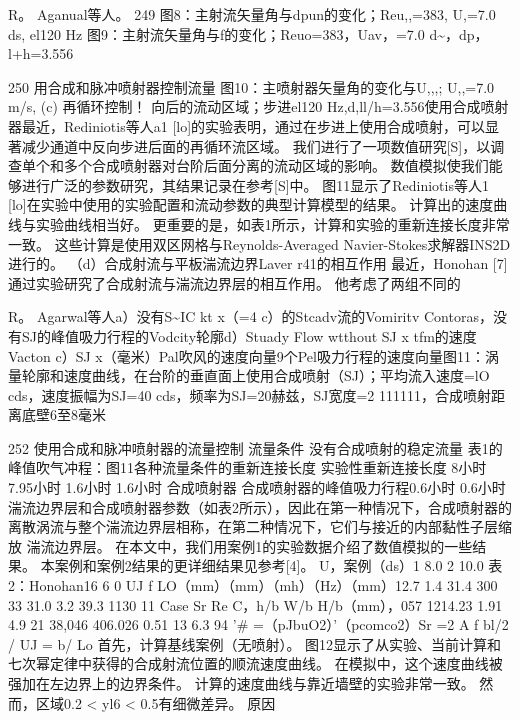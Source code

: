 \documentclass[UTF8,11pt,a4paper,openany,fontset=fandol]{ctexbook}
\begin{document}
R。 Aganual等人。 249 图8：主射流矢量角与dpun的变化；Reu,,=383, U,=7.0 ds, el120 Hz 图9：主射流矢量角与f的变化；Reuo=383，Uav，=7.0 d\textasciitilde{}，dp，l+h=3.556

250 用合成和脉冲喷射器控制流量 图10：主喷射器矢量角的变化与U,,,; U,,=7.0 m/s, (c) 再循环控制！ 向后的流动区域；步进el120 Hz,d,ll/h=3.556使用合成喷射器最近，Rediniotis等人a1 [lo]的实验表明，通过在步进上使用合成喷射，可以显著减少通道中反向步进后面的再循环流区域。 我们进行了一项数值研究[S]，以调查单个和多个合成喷射器对台阶后面分离的流动区域的影响。 数值模拟使我们能够进行广泛的参数研究，其结果记录在参考[S]中。 图11显示了Rediniotis等人1 [lo]在实验中使用的实验配置和流动参数的典型计算模型的结果。 计算出的速度曲线与实验曲线相当好。 更重要的是，如表1所示，计算和实验的重新连接长度非常一致。 这些计算是使用双区网格与Reynolds-Averaged Navier-Stokes求解器INS2D进行的。 （d）合成射流与平板湍流边界Laver r41的相互作用 最近，Honohan [7]通过实验研究了合成射流与湍流边界层的相互作用。 他考虑了两组不同的

R。 Agarwal等人a）没有S\textasciitilde{}IC kt x（=4 c）的Stcadv流的Vomiritv Contoras，没有SJ的峰值吸力行程的Vodcity轮廓d）Stuady Flow wtthout SJ x tfm的速度Vacton c）SJ x（毫米）Pal吹风的速度向量9个Pel吸力行程的速度向量图11：涡量轮廓和速度曲线，在台阶的垂直面上使用合成喷射（SJ）；平均流入速度=lO cds，速度振幅为SJ=40 cds，频率为SJ=20赫兹，SJ宽度=2 111111，合成喷射距离底壁6至8毫米

252 使用合成和脉冲喷射器的流量控制 流量条件 没有合成喷射的稳定流量 表1的峰值吹气冲程：图11各种流量条件的重新连接长度 实验性重新连接长度 8小时 7.95小时 1.6小时 1.6小时 合成喷射器 合成喷射器的峰值吸力行程0.6小时 0.6小时 湍流边界层和合成喷射器参数（如表2所示），因此在第一种情况下，合成喷射器的离散涡流与整个湍流边界层相称，在第二种情况下，它们与接近的内部黏性子层缩放 湍流边界层。 在本文中，我们用案例1的实验数据介绍了数值模拟的一些结果。 本案例和案例2结果的更详细结果见参考[4]。 U，案例（ds）1 8.0 2 10.0 表2：Honohan16 6 0 UJ f LO（mm）（mm）（mh）（Hz）（mm）12.7 1.4 31.4 300 33 31.0 3.2 39.3 1130 11 Case Sr Re C，h/b W/b H/b（mm），057 1214.23 1.91 4.9 21 38,046 406.026 0.51 13 6.3 94 '\# =（pJbuO2）'（pcomco2）Sr =2 A f bl/2 / UJ = b/ Lo 首先，计算基线案例（无喷射）。 图12显示了从实验、当前计算和七次幂定律中获得的合成射流位置的顺流速度曲线。 在模拟中，这个速度曲线被强加在左边界上的边界条件。 计算的速度曲线与靠近墙壁的实验非常一致。 然而，区域0.2 < yl6 < 0.5有细微差异。 原因
\end{document}
